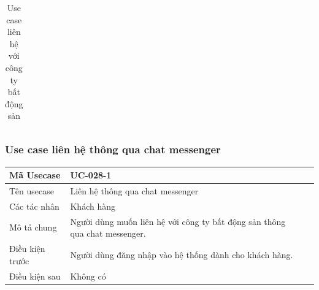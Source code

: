 \documentclass[12pt,a4paper]{article}
\begin{document}
\begin{table}[H]
\begin{tabular}{|p{3.5cm}|p{11.5cm}|c|}
            \\ \hline
        \end{tabular}
        \caption{Use case liên hệ với công ty bất động sản}

    \end{table}


    \subsubsection*{Use case liên hệ thông qua chat messenger}
    \begin{table}[H]
        \centering
        \begin{tabular}{|p{3.5cm}|p{11.5cm}|c|}
            \hline
            Mã Usecase      & UC-028-1                                                                   \\
            \hline
            Tên usecase     & Liên hệ thông qua chat messenger                                           \\
            \hline
            Các tác nhân    & Khách hàng                                                                 \\
            \hline
            Mô tả chung     & Người dùng muốn liên hệ với công ty bất động sản thông qua chat messenger. \\
            \hline

            Điều kiện trước & Người dùng đăng nhập vào hệ thống dành cho khách hàng.                     \\
            \hline

            Điều kiện sau   & Không có                                                                   \\
            \hline


\end{tabular}
\end{table}
\end{document}

